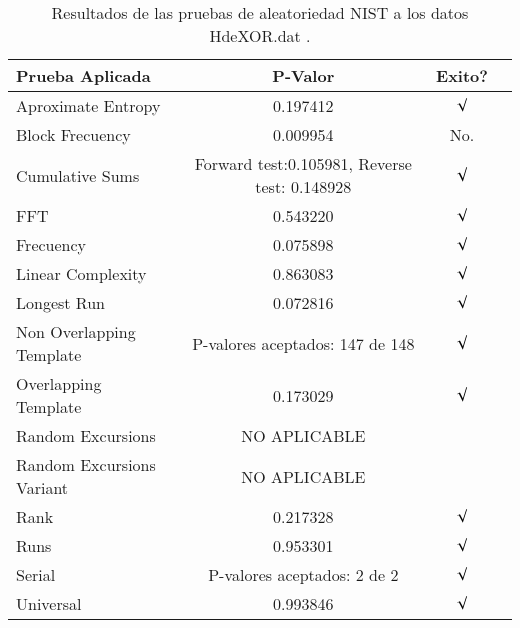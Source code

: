 \documentclass[12pt,3p]{elsarticle}
\begin{document}
\begin{table}[H]
\caption{Resultados de las pruebas de aleatoriedad NIST a los datos HdeXOR.dat .}
\label{sample-table}
\vskip 0.15in
\begin{center}
\begin{small}
\begin{sc}
\begin{tabular}{lccr}
\hline

Prueba Aplicada &  P-Valor & Exito? \\
\hline

Aproximate Entropy    &   0.197412  & $\surd$ \\

Block Frecuency  & 0.009954 &  No. \\

Cumulative Sums    &   Forward test:0.105981, Reverse test: 0.148928  & $\surd$ \\

FFT    &   0.543220 &   $\surd$      \\

Frecuency     &  0.075898 &  $\surd$   \\

Linear Complexity      &  0.863083  & $\surd$ \\

Longest Run      &  0.072816 &    $\surd$      \\

Non Overlapping Template      & P-valores aceptados: 147 de 148    &     $\surd$          \\

Overlapping Template      &  0.173029  &        $\surd$       \\

Random Excursions      &  NO APLICABLE &       \\

Random Excursions Variant &  NO APLICABLE  &      \\

Rank &    0.217328   &       $\surd$       \\

Runs &    0.953301 &     $\surd$        \\

Serial &     P-valores aceptados: 2 de 2    &     $\surd$        \\

Universal &      0.993846 &   $\surd$            \\

\hline



\end{tabular}
\end{sc}
\end{small}
\end{center}
\vskip -0.1in
\end{table}
\end{document}
